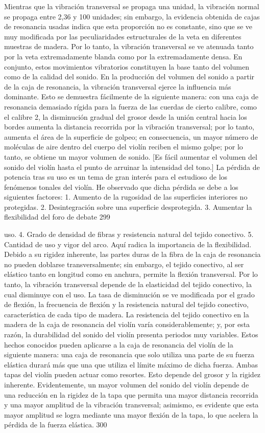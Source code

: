 Mientras que la vibración transversal se propaga una unidad, la vibración normal se propaga entre 2,36 y 100 unidades; sin embargo, la evidencia obtenida de cajas de resonancia usadas indica que esta proporción no es constante, sino que se ve muy modificada por las peculiaridades estructurales de la veta en diferentes muestras de madera. Por lo tanto, la vibración transversal se ve atenuada tanto por la veta extremadamente blanda como por la extremadamente densa.
En conjunto, estos movimientos vibratorios constituyen la base tanto del volumen como de la calidad del sonido. En la producción del volumen del sonido a partir de la caja de resonancia, la vibración transversal ejerce la influencia más dominante. Esto se demuestra fácilmente de la siguiente manera: con una caja de resonancia demasiado rígida para la fuerza de las cuerdas de cierto calibre, como el calibre 2, la disminución gradual del grosor desde la unión central hacia los bordes aumenta la distancia recorrida por la vibración transversal; por lo tanto, aumenta el área de la superficie de golpeo; en consecuencia, un mayor número de moléculas de aire dentro del cuerpo del violín reciben el mismo golpe; por lo tanto, se obtiene un mayor volumen de sonido.
[Es fácil aumentar el volumen del sonido del violín hasta el punto de arruinar la intensidad del tono.]
La pérdida de potencia tras su uso es un tema de gran interés para el estudioso de los fenómenos tonales del violín. He observado que dicha pérdida se debe a los siguientes factores:
1. Aumento de la rugosidad de las superficies interiores no protegidas.
2. Desintegración sobre una superficie desprotegida.
3. Aumentar la flexibilidad del foro de debate
299

uso.
4. Grado de densidad de fibras y resistencia natural del tejido conectivo.
5. Cantidad de uso y vigor del arco.
Aquí radica la importancia de la flexibilidad. Debido a su rigidez inherente, las partes duras de la fibra de la caja de resonancia no pueden doblarse transversalmente; sin embargo, el tejido conectivo, al ser elástico tanto en longitud como en anchura, permite la flexión transversal. Por lo tanto, la vibración transversal depende de la elasticidad del tejido conectivo, la cual disminuye con el uso. La tasa de disminución se ve modificada por el grado de flexión, la frecuencia de flexión y la resistencia natural del tejido conectivo, característica de cada tipo de madera. La resistencia del tejido conectivo en la madera de la caja de resonancia del violín varía considerablemente; y, por esta razón, la durabilidad del sonido del violín presenta periodos muy variables. Estos hechos conocidos pueden aplicarse a la caja de resonancia del violín de la siguiente manera: una caja de resonancia que solo utiliza una parte de su fuerza elástica durará más que una que utiliza el límite máximo de dicha fuerza.
Ambas tapas del violín pueden actuar como resortes. Esto depende del grosor y la rigidez inherente. Evidentemente, un mayor volumen del sonido del violín depende de una reducción en la rigidez de la tapa que permita una mayor distancia recorrida y una mayor amplitud de la vibración transversal; asimismo, es evidente que esta mayor amplitud se logra mediante una mayor flexión de la tapa, lo que acelera la pérdida de la fuerza elástica.
300

